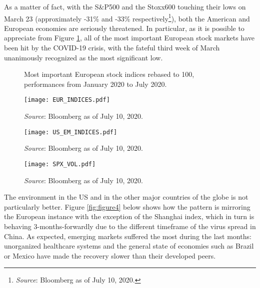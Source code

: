 \documentclass[12pt]{article}
\begin{document}
As a matter of fact, with the S\&P500 and the Stoxx600 touching their lows on March 23 (approximately -31\% and -33\% respectively\footnote{\textit{Source}: Bloomberg as of July 10, 2020.}), both the American and European economies are seriously threatened. In particular, as it is possible to appreciate from Figure \ref{fig:figure3}, all of the most important European stock markets have been hit by the COVID-19 crisis, with the fateful third week of March unanimously recognized as the most significant low.

\begin{figure}[h]
\begin{center}
\caption{Most important European stock indices rebased to 100, performances from January 2020 to July 2020.}
\texttt{[image: EUR\_INDICES.pdf]}
\caption*{\textit{Source}: Bloomberg as of July 10, 2020.}
\label{fig:figure3}
\end{center}
\end{figure}

\begin{figure}[h]
\centering
\begin{minipage}[b]{.45\textwidth}
\centering
{}
\texttt{[image: US\_EM\_INDICES.pdf]}
\caption*{\textit{Source}: Bloomberg as of July 10, 2020.}
\label{fig:figure4}
\end{minipage}%
\hfill
\begin{minipage}[b]{.45\textwidth}
\centering
{}
\texttt{[image: SPX\_VOL.pdf]}
\caption*{\textit{Source}: Bloomberg as of July 10, 2020.}
\label{fig:figure5}
\end{minipage}
\end{figure}

The environment in the US and in the other major countries of the globe is not particularly better. Figure \ref{fig:figure4} below shows how the pattern is mirroring the European instance with the exception of the Shanghai index, which in turn is behaving 3-months-forwardly due to the different timeframe of the virus spread in China. As expected, emerging markets suffered the most during the last months: unorganized healthcare systems and the general state of economies such as Brazil or Mexico have made the recovery slower than their developed peers.
\end{document}
